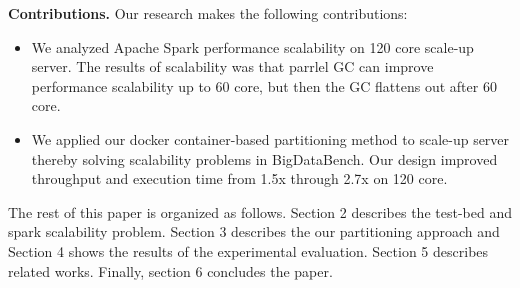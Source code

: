 \fi

\ifkor

\textbf{Contributions.} Our research makes the following contributions:
\begin{itemize}
\item 
We analyzed Apache Spark performance scalability on 120 core scale-up server.
The results of scalability was that parrlel GC can improve performance
scalability up to 60 core, but then the GC flattens out after 60 core.
\item 
We applied our docker container-based partitioning method to scale-up server
thereby solving scalability problems in BigDataBench.
Our design improved throughput and execution time from 1.5x through
2.7x on 120 core.
\end{itemize}

\else

\fi


The rest of this paper is organized as follows.
Section 2 describes the test-bed and spark scalability problem.
Section 3 describes the our partitioning approach and 
Section 4 shows the results of the experimental evaluation. 
Section 5 describes related works. 
Finally, section 6 concludes the paper.

